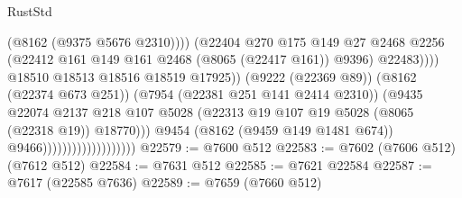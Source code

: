 \begin{lexlean}{RustStd}
\begin{coremodule}
                                                          (@8162 (@9375 @5676 @2310))))
                                                      (@22404
                                                        @270
                                                        @175
                                                        @149
                                                        @27
                                                        @2468
                                                        @2256
                                                        (@22412
                                                          @161
                                                          @149
                                                          @161
                                                          @2468
                                                          (@8065 (@22417 @161))
                                                          @9396)
                                                        @22483))))
                                                @18510
                                                @18513
                                                @18516
                                                @18519
                                                @17925))
                                            (@9222 (@22369 @89))
                                            (@8162 (@22374 @673 @251))
                                            (@7954 (@22381 @251 @141 @2414 @2310))
                                            (@9435
                                              @22074
                                              @2137
                                              @218
                                              @107
                                              @5028
                                              (@22313
                                                @19
                                                @107
                                                @19
                                                @5028
                                                (@8065 (@22318 @19))
                                                @18770)))
                                          @9454
                                          (@8162 (@9459 @149 @1481 @674))
                                          @9466)))))))))))))))))))
@22579 := @7600 @512
@22583 := @7602 (@7606 @512) (@7612 @512)
@22584 := @7631 @512
@22585 := @7621 @22584
@22587 := @7617 (@22585 @7636)
@22589 := @7659 (@7660 @512)

\end{coremodule}
\end{lexlean}

